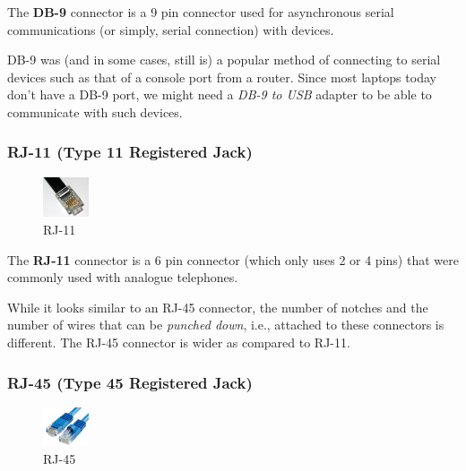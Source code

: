 The \textbf{DB-9} connector is a 9 pin connector used for asynchronous serial communications (or simply, serial connection) with devices. 

DB-9 was (and in some cases, still is) a popular method of connecting to serial devices such as that of a console port from a router. Since most laptops today don't have a DB-9 port, we might need a \textit{DB-9 to USB} adapter to be able to communicate with such devices. 

\subsubsection{RJ-11 (Type 11 Registered Jack)}
\vspace{-10pt}
\begin{figure}
	\centering
	\vspace{-12pt}
	\includegraphics[width=0.12\textwidth]{"Mod1/chapters/1.4.i RJ-11"}
	\caption{\label{fig:rj11_con}RJ-11}
	\vspace{-20pt}
\end{figure}

The \textbf{RJ-11} connector is a 6 pin connector (which only uses 2 or 4 pins) that were commonly used with analogue telephones. 

While it looks similar to an RJ-45 connector, the number of notches and the number of wires that can be \textit{punched down}, i.e., attached to these connectors is different. The RJ-45 connector is wider as compared to RJ-11. 

\subsubsection{RJ-45 (Type 45 Registered Jack)}
\vspace{-10pt}
\begin{figure}
	\centering
	\vspace{-12pt}
	\includegraphics[width=0.12\textwidth]{"Mod1/chapters/1.4.j RJ-45"}
	\caption{\label{fig:rj45_con}RJ-45}
	\vspace{-15pt}
\end{figure}

